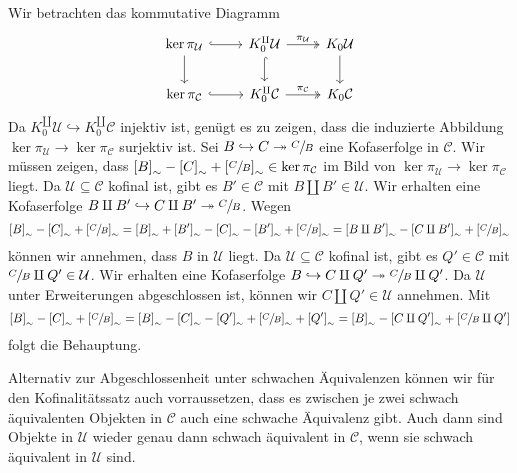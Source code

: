 \begin{beweis}[name={des Kofinalitätssatzes}]
	Wir betrachten das kommutative Diagramm
	\[
		\begin{tikzcd}
			\ker \pi_\mathcal{U} \rar[hook] \dar  &  K_0^\amalg \mathcal{U} \dar[hook] \rar["\pi_\mathcal{U}",two heads] & K_0 \mathcal{U} \dar \\
			\ker \pi_\mathcal{C} \rar[hook] &  K_0^\amalg \mathcal{C} \rar["\pi_\mathcal{C}",two heads] & K_0 \mathcal{C}
		\end{tikzcd}
	\]
	Da $K_0^\amalg \mathcal{U} \hookrightarrow K_0^\amalg \mathcal{C}$ injektiv ist, genügt es zu zeigen, dass die induzierte Abbildung $\ker \pi_\mathcal{U} \to \ker \pi_\mathcal{C}$ surjektiv ist.
	Sei $B \hookrightarrow C \twoheadrightarrow \sfrac{C}{B}$ eine Kofaserfolge in $\mathcal{C}$.
	Wir müssen zeigen, dass $\benbrace*{B}_\sim - \benbrace*{C}_\sim + \benbrace*{\sfrac{C}{B}}_\sim \in \ker \pi_\mathcal{C}$ im Bild von $\ker \pi_\mathcal{U} \to \ker \pi_\mathcal{C}$ liegt.
	Da $\mathcal{U} \subseteq \mathcal{C}$ kofinal ist, gibt es $B' \in \mathcal{C}$ mit $B \amalg B' \in \mathcal{U}$.
	Wir erhalten eine Kofaserfolge $B \amalg B' \hookrightarrow C \amalg B' \twoheadrightarrow \sfrac{C}{B}$.
	Wegen 
	\[
		\benbrace*{B}_\sim - \benbrace*{C}_\sim + \benbrace*{\sfrac{C}{B}}_\sim = \benbrace*{B}_\sim + \benbrace*{B'}_\sim - \benbrace*{C}_\sim - \benbrace*{B'}_\sim + \benbrace*{\sfrac{C}{B}}_\sim = \benbrace*{B \amalg B'}_\sim - \benbrace*{C \amalg B'}_\sim + \benbrace*{\sfrac{C}{B}}_\sim
	\]
	können wir annehmen, dass $B$ in $\mathcal{U}$ liegt.
	Da $\mathcal{U} \subseteq \mathcal{C}$ kofinal ist, gibt es $Q' \in \mathcal{C}$ mit $\sfrac{C}{B} \amalg Q' \in \mathcal{U}$.
	Wir erhalten eine Kofaserfolge $B \hookrightarrow C \amalg Q' \twoheadrightarrow \sfrac{C}{B} \amalg Q'$.
	Da $\mathcal{U}$ unter Erweiterungen abgeschlossen ist, können wir $C \amalg Q' \in \mathcal{U}$ annehmen.
	Mit 
	\[
		\benbrace*{B}_\sim - \benbrace*{C}_\sim + \benbrace*{\sfrac{C}{B}}_\sim = \benbrace*{B}_\sim - \benbrace*{C}_\sim - \benbrace*{Q'}_\sim + \benbrace*{\sfrac{C}{B}}_\sim + \benbrace*{Q'}_\sim = \benbrace*{B}_\sim - \benbrace*{C \amalg Q'}_\sim + \benbrace*{\sfrac{C}{B} \amalg Q'} 
	\]
	folgt die Behauptung.
\end{beweis}

\begin{bemerkung}
	Alternativ zur Abgeschlossenheit unter schwachen Äquivalenzen können wir für den Kofinalitätssatz auch vorraussetzen, dass es zwischen je zwei schwach äquivalenten Objekten in $\mathcal{C}$ auch eine schwache Äquivalenz gibt.
	Auch dann sind Objekte in $\mathcal{U}$ wieder genau dann schwach äquivalent in $\mathcal{C}$, wenn sie schwach äquivalent in $\mathcal{U}$ sind.
\end{bemerkung}


